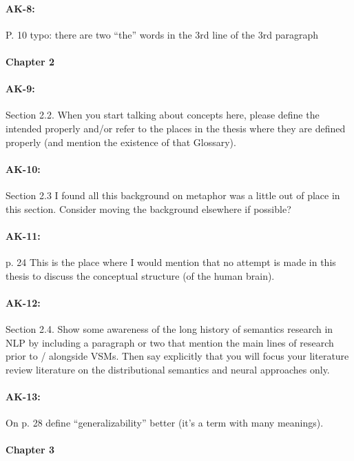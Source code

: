 \documentclass[11pt,a4paper]{article}
\begin{document}
{\paragraph{AK-8:} P. 10 typo: there are two “the” words in the 3rd line of the 3rd paragraph

\paragraph{Chapter 2}

\paragraph{AK-9:} Section 2.2. When you start talking about concepts here, please define the intended properly and/or refer to the places in the thesis where they are defined properly (and mention the existence of that Glossary).

\paragraph{AK-10:} Section 2.3 I found all this background on metaphor was a little out of place in this section. Consider moving the background elsewhere if possible?

\paragraph{AK-11:} p. 24 This is the place where I would mention that no attempt is made in this thesis to discuss the conceptual structure (of the human brain).

\paragraph{AK-12:} Section 2.4. Show some awareness of the long history of semantics research in NLP by including a paragraph or two that mention the main lines of research prior to / alongside VSMs. Then say explicitly that you will focus your literature review literature on the distributional semantics and neural approaches only.

\paragraph{AK-13:} On p. 28 define “generalizability” better (it’s a term with many meanings).

\paragraph{Chapter 3}

}
\end{document}
